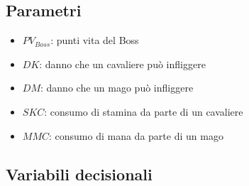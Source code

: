 \documentclass[12pt]{article}
\begin{document}
    \subsection{Parametri}
    \begin{itemize}
        \item $PV_{Boss}$: punti vita del Boss
        \item $DK$: danno che un cavaliere può infliggere
        \item $DM$: danno che un mago può infliggere
        \item $SKC$: consumo di stamina da parte di un cavaliere
        \item $MMC$: consumo di mana da parte di un mago
    \end{itemize}
   \subsection{Variabili decisionali}
\end{document}
